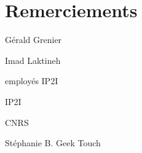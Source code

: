 \chapter*{Remerciements}

Gérald Grenier

Imad Laktineh

employés IP2I

IP2I

CNRS

Stéphanie B. Geek Touch